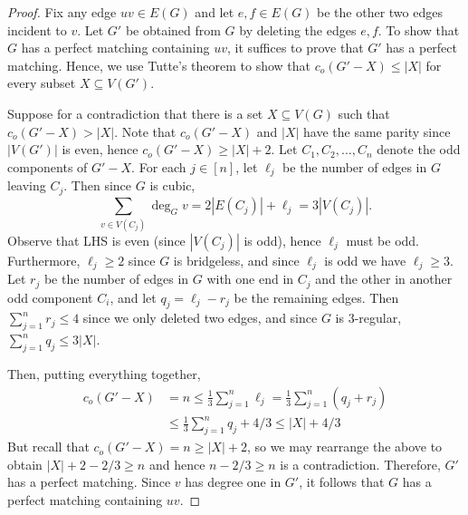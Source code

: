 \begin{proof}
Fix any edge \( uv \in E(G) \) and let \( e,f \in E(G) \) be the other two edges incident to \( v \). Let \( G' \) be obtained from \( G \) by deleting the edges \( e,f \). To show that \( G \) has a perfect matching containing \( uv \), it suffices to prove that \( G' \) has a perfect matching. Hence, we use Tutte's theorem to show that \( c_{o} (G' - X) \leq |X| \) for every subset \( X \subseteq V(G') \).

Suppose for a contradiction that there is a set \( X \subseteq V(G) \) such that \( c_{o} (G' - X) > |X| \). Note that \( c_{o} (G' - X) \) and \( |X| \) have the same parity since \( |V(G')| \) is even, hence \( c_{o} (G' - X) \geq |X| + 2 \). Let \( C_1, C_2, \hdots , C_{n}  \) denote the odd components of \( G' - X \). For each \( j \in [n] \), let \( \ell_{j}  \) be the number of edges in \( G \) leaving \( C_{j}  \). Then since \( G \) is cubic, \[ \sum_{v \in V(C_{j})}^{} \deg_{G} v = 2 |E(C_{j})| + \ell_{j} = 3 |V(C_{j})|. \] Observe that LHS is even (since \( |V(C_{j})| \) is odd), hence \( \ell_{j} \) must be odd. Furthermore, \( \ell_{j} \geq 2 \) since \( G \) is bridgeless, and since \( \ell_{j}  \) is odd we have \( \ell_{j} \geq 3 \). Let \( r_{j} \) be the number of edges in \( G \) with one end in \( C_{j}  \) and the other in another odd component \( C_{i}  \), and let \( q_{j} = \ell_{j} - r_{j}  \) be the remaining edges. Then \( \sum_{j=1}^{n} r_{j} \leq 4 \) since we only deleted two edges, and since \( G \) is 3-regular, \( \sum_{j=1}^{n} q_{j} \leq 3|X|  \). 

Then, putting everything together,
\begin{align*}
	c_{o} (G' - X) &= n \leq \frac{1}{3} \sum_{j=1}^{n} \ell_{j} = \frac{1}{3} \sum_{j=1}^{n} (q_{j} + r_{j}) \\
	 &\leq \frac{1}{3}\sum_{j=1}^{n} q_{j} + 4/3 \leq |X| + 4/3
\end{align*}
But recall that \( c_{o} (G' - X) = n \geq |X| + 2\), so we may rearrange the above to obtain \( |X| + 2 - 2/3 \geq n \) and hence \( n - 2/3 \geq n \) is a contradiction. Therefore, \( G' \) has a perfect matching. Since \( v \) has degree one in \( G' \), it follows that \( G \) has a perfect matching containing \( uv \). 
\end{proof}

